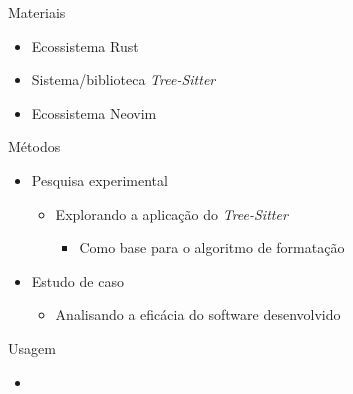 \documentclass
  [ aspectratio=169,
    english,
    hyperref={citecolor=blue,colorlinks=true,linkcolor=blue,urlcolor=blue},
    brazil]
  {beamer}
\newcommand{\treesitter}{\textit{Tree-Sitter}\xspace}
\begin{document}

  \begin{frame}{Materiais}
    \begin{itemize}
      \item Ecossistema Rust
      \item Sistema/biblioteca \treesitter \cite{tree-sitter-2023-tree}
      \item Ecossistema Neovim
    \end{itemize}
  \end{frame}


  \begin{frame}{Métodos}
    \begin{itemize}
      \item Pesquisa experimental
            \begin{itemize}
              \item Explorando a aplicação do \treesitter
                    \begin{itemize}
                      \item Como base para o algoritmo de formatação
                    \end{itemize}
            \end{itemize}
      \item Estudo de caso
            \begin{itemize}
              \item Analisando a eficácia do software desenvolvido
            \end{itemize}
    \end{itemize}
  \end{frame}


  \begin{frame}[fragile]{Usagem}
    \begin{itemize}
      \item {}
    \end{itemize}
  \end{frame}

\end{document}
